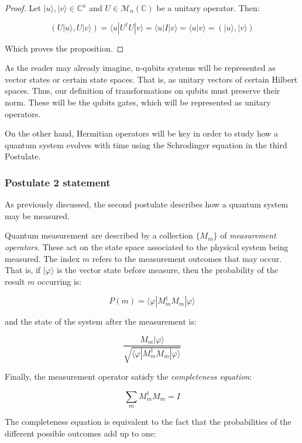 \begin{proof}
	Let $|u\rangle, |v\rangle \in \mathds{C}^n$ and $U \in \mathcal{M}_n(\mathds{C})$ be a unitary operator. Then:
	
	$$ ( U|u\rangle, U|v\rangle) = \langle u|U^\dagger U|v\rangle = \langle u|I|v\rangle = \langle u|v\rangle = ( |u\rangle, |v\rangle) $$
	
	Which proves the proposition.
\end{proof}

As the reader may already imagine, n-qubits systems will be represented as vector states or certain state spaces. That is, as unitary vectors of certain Hilbert spaces. Thus, our definition of transformations on qubits must preserve their norm. These will be the qubits gates, which will be represented as unitary operators.

On the other hand, Hermitian operators will be key in order to study how a quantum system evolves with time using the Schrodinger equation in the third Postulate.


\subsubsection{Postulate 2 statement}


As previously discussed, the second postulate describes how a quantum system may be measured.

\begin{postulate}
	Quantum measurement are described by a collection $\{M_m\}$ of \emph{measurement operators}. These act on the state space associated to the physical system being measured. The index $m$ refers to the measurement outcomes that may occur. That is, if $|\varphi\rangle$ is the vector state before measure, then the probability of the result $m$ occurring is:
	
	$$P(m) = \langle\varphi|M_m^\dagger M_m|\varphi\rangle $$
	
	and the state of the system after the measurement is:
	
	$$ \frac{M_m|\varphi\rangle}{\sqrt{\langle\varphi|M_m^\dagger M_m|\varphi\rangle}}$$
	
	Finally, the measurement operator satisfy the \emph{completeness equation}: 
	
	$$\sum_m M_m^\dagger M_m = I$$
\end{postulate}

The completeness equation is equivalent to the fact that the probabilities of the different possible outcomes add up to one:


